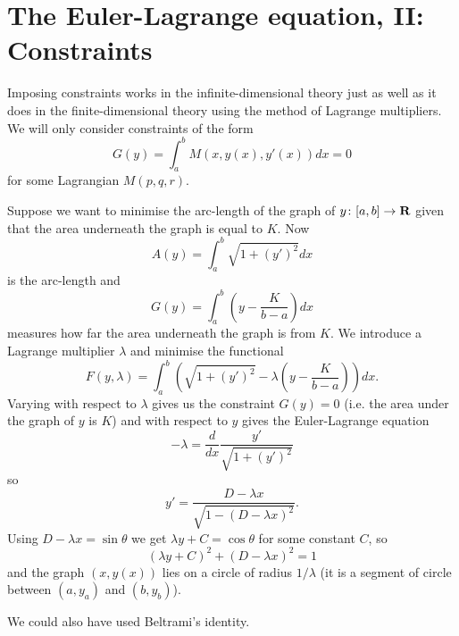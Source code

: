 \chapter[Euler-Lagrange II]{The Euler-Lagrange equation, II:\\ Constraints}

Imposing constraints works in the infinite-dimensional theory just as well as it does in the finite-dimensional theory using the method of Lagrange multipliers. We will only consider constraints of the form
\[G(y)=\int_a^bM(x,y(x),y'(x))dx=0\]
for some Lagrangian $M(p,q,r)$.

\begin{exm}
Suppose we want to minimise the arc-length of the graph of $y\colon[a,b]\to\mathbf{R}$ given that the area underneath the graph is equal to $K$. Now
\[A(y)=\int_a^b\sqrt{1+(y')^2}dx\]
is the arc-length and
\[G(y)=\int_a^b\left(y-\frac{K}{b-a}\right)dx\]
measures how far the area underneath the graph is from $K$. We introduce a Lagrange multiplier $\lambda$ and minimise the functional
\[F(y,\lambda)=\int_a^b\left(\sqrt{1+(y')^2}-\lambda\left(y-\frac{K}{b-a}\right)\right)dx.\]
Varying with respect to $\lambda$ gives us the constraint $G(y)=0$ (i.e. the area under the graph of $y$ is $K$) and with respect to $y$ gives the Euler-Lagrange equation
\[-\lambda=\frac{d}{dx}\frac{y'}{\sqrt{1+(y')^2}}\]
so
\[y'=\frac{D-\lambda x}{\sqrt{1-(D-\lambda x)^2}}.\]
Using $D-\lambda x=\sin\theta$ we get $\lambda y+C=\cos\theta$ for some constant $C$, so
\[(\lambda y +C)^2+(D-\lambda x)^2=1\]
and the graph $(x,y(x))$ lies on a circle of radius $1/\lambda$ (it is a segment of circle between $(a,y_a)$ and $(b,y_b)$).

We could also have used Beltrami's identity.
\end{exm}
